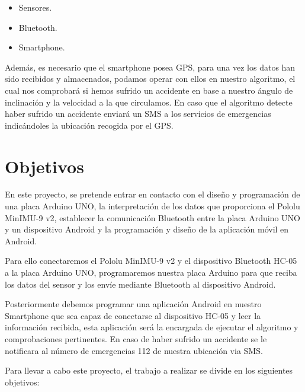 		\begin{itemize}
			\item Sensores.
			\item Bluetooth.
			\item Smartphone.
		\end{itemize}
		
		Adem\'as, es necesario que el smartphone posea GPS, para una vez los datos han sido recibidos y almacenados, podamos operar con ellos en nuestro algoritmo, el cual nos comprobar\'a si hemos sufrido un accidente en base a nuestro \'angulo de inclinaci\'on y la velocidad a la que circulamos. En caso que el algoritmo detecte haber sufrido un accidente enviar\'a un SMS a los servicios de emergencias indic\'andoles la ubicaci\'on recogida por el GPS.
	
	
	\section{Objetivos}
	
		En este proyecto, se pretende entrar en contacto con el dise\~no y programaci\'on de una placa Arduino UNO, la interpretaci\'on de los datos que proporciona el Pololu MinIMU-9 v2, establecer la comunicaci\'on Bluetooth entre la placa Arduino UNO y un dispositivo Android y la programaci\'on y dise\~no de la aplicaci\'on m\'ovil en Android.
	
		Para ello conectaremos el Pololu MinIMU-9 v2 y el dispositivo Bluetooth HC-05 a la placa Arduino UNO, programaremos nuestra placa Arduino para que reciba los datos del sensor y los env\'ie mediante Bluetooth al dispositivo Android.
		
		Posteriormente debemos programar una aplicaci\'on Android en nuestro Smartphone que sea capaz de conectarse al dispositivo HC-05 y leer la informaci\'on recibida, esta aplicaci\'on ser\'a la encargada de ejecutar el algoritmo y comprobaciones pertinentes. En caso de haber sufrido un accidente se le notificara al n\'umero de emergencias 112 de nuestra ubicaci\'on via SMS.
		
		Para llevar a cabo este proyecto, el trabajo a realizar se divide en los siguientes objetivos:
		
